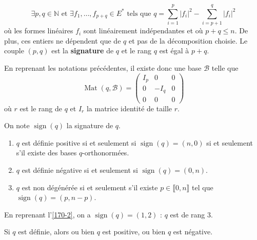 
  \begin{theorem}
    \[ \exists p, q \in \mathbb{N} \text{ et } \exists f_1, \dots, f_{p+q} \in E^* \text{ tels que } q = \sum_{i=1}^p |f_i|^2 - \sum_{i=p+1}^q |f_i|^2 \]
    où les formes linéaires $f_i$ sont linéairement indépendantes et où $p + q \leq n$. De plus, ces entiers ne dépendent que de $q$ et pas de la décomposition choisie.
    \newpar
    Le couple $(p,q)$ est la \textbf{signature} de $q$ et le rang $q$ est égal à $p+q$.
  \end{theorem}

  \begin{remark}
    En reprenant les notations précédentes, il existe donc une base $\mathcal{B}$ telle que
    \[
    \operatorname{Mat}(q, \mathcal{B}) =
    \begin{pmatrix}
      I_p & 0 & 0 \\
      0 & -I_q & 0 \\
      0 & 0 & 0
    \end{pmatrix}
    \]
    où $r$ est le rang de $q$ et $I_r$ la matrice identité de taille $r$.
  \end{remark}


  \begin{corollary}
    On note $\operatorname{sign}(q)$ la signature de $q$.
    \begin{enumerate}[label={\bfseries(\roman*)}]
      \item $q$ est définie positive si et seulement si $\operatorname{sign}(q) = (n, 0)$ si et seulement s'il existe des bases $q$-orthonormées.
      \item $q$ est définie négative si et seulement si $\operatorname{sign}(q) = (0, n)$.
      \item $q$ est non dégénérée si et seulement s'il existe $p \in \llbracket 0,n \rrbracket$ tel que $\operatorname{sign}(q) = (p, n-p)$.
    \end{enumerate}
  \end{corollary}


  \begin{example}
    En reprenant l'\cref{170-2}, on a $\operatorname{sign}(q) = (1,2)$ : $q$ est de rang $3$.
  \end{example}

  \begin{proposition}
    Si $q$ est définie, alors ou bien $q$ est positive, ou bien $q$ est négative.
  \end{proposition}


